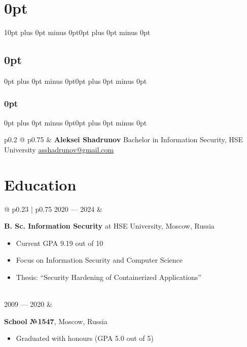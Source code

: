 \documentclass[12pt, a4paper]{extarticle}
\begin{document}
\titlespacing\section{0pt}{10pt plus 0pt minus 0pt}{0pt plus 0pt minus 0pt}
\titlespacing\subsection{0pt}{0pt plus 0pt minus 0pt}{0pt plus 0pt minus 0pt}
\titlespacing\subsubsection{0pt}{0pt plus 0pt minus 0pt}{0pt plus 0pt minus 0pt}

\begin{tabular}{ p{0.2\textwidth} @{\textwidth} p{0.75\textwidth} }
    &
    {\huge \bf \raggedleft Aleksei Shadrunov}  \newline
    \small
    {Bachelor in Information Security, HSE University} \newline
    \href{mailto:asshadrunov@gmail.com}{asshadrunov@gmail.com} \\
\end{tabular}

\section*{Education}

\begin{tabular}{ @{\hskip 0pt} p{0.23\textwidth} | p{0.75\textwidth} }
    2020 — 2024
    & 
    \begin{minipage}[t]{\linewidth}
        {\bf B. Sc. Information Security} at HSE University, Moscow, Russia 
        \begin{itemize}[nosep,after=\strut]
            \item Current GPA 9.19 out of 10
            \item Focus on Information Security and Computer Science
            \item Thesis: ``Security Hardening of Containerized Applications''
        \end{itemize}
    \end{minipage} \\
    2009 — 2020 
    & 
    \begin{minipage}[t]{\linewidth}
        {\bf School №1547}, Moscow, Russia 
        \begin{itemize}[nosep,after=\strut]
            \item Graduated with honours (GPA 5.0 out of 5)
        \end{itemize}
    \end{minipage} \\
\end{tabular}
\end{document}
